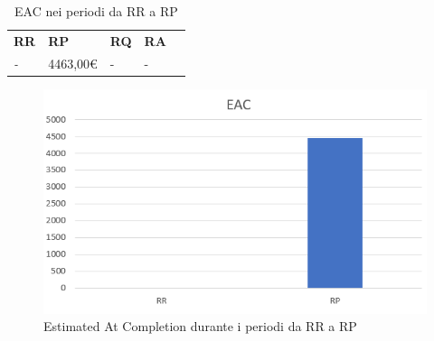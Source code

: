 \renewcommand{\arraystretch}{1.5}
\begin{longtable}{ C{3cm} C{3cm}  C{3cm}  C{3cm} c }
    \caption{ EAC nei periodi da RR a RP} \\
    \rowcolor{\primaryColor}
    \textcolor{\secondaryColor}{
    \centering\textbf{RR}}     & \textcolor{\secondaryColor}{\centering\textbf{RP}}    & \textcolor{\secondaryColor}
    {\centering\textbf{RQ}} & \textcolor{\secondaryColor}{\centering\textbf{RA}}    \\
    \textit{-}           & 4463,00\euro                                  & - & - \\
\end{longtable}

\begin{figure}[H]
	\centering
	\includegraphics[scale=0.8]{src/ResocontoVerifica/src/img/EAC.png}
	\caption{Estimated At Completion durante i periodi da RR a RP}
\end{figure}
